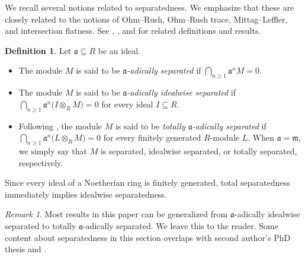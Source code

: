 \documentclass[12pt,reqno]{amsart}
\newtheorem{question}[theorem]{Question}
\theoremstyle{definition}
\newtheorem{definition}[theorem]{Definition}
\theoremstyle{remark}
\newtheorem{remark}[theorem]{Remark}
\theoremstyle{cited}
\theoremstyle{remark}
\theoremstyle{citeddef}
\newcommand{\fm}{\mathfrak{m}}
\begin{document}
	
	
	We recall several notions related to separatedness. We emphasize that these are closely related to the notions of Ohm--Rush, Ohm--Rush trace, Mittag--Leffler, and intersection flatness. See \cite{DET}, \cite{EpsteinShapiro}, and \cite{HJ} for related definitions and results.%
	
	\begin{definition}\label{def:separation-notions}
		Let $\mathfrak a\subseteq R$ be an ideal.
		\begin{itemize}
			\item[(a)] The module $M$ is said to be
			\emph{$\mathfrak a$-adically separated} if
			\(
			\bigcap_{n\geq 1}\mathfrak a^nM=0.
			\)
			
			\item[(b)] The module $M$ is said to be
			\emph{$\mathfrak a$-adically idealwise separated} if
			\(
			\bigcap_{n\geq1}
			\mathfrak a^n\bigl(I\otimes_RM\bigr)=0
			\)
			for every ideal $I\subseteq R$.
			
			\item[(c)] Following \cite{Zoeschinger}, the module $M$ is said to be
			\emph{totally $\mathfrak a$-adically separated} if
			\(
			\bigcap_{n\geq1}
			\mathfrak a^n\bigl(L\otimes_RM\bigr)=0
			\)
			for every finitely generated $R$-module $L$.
			When $\mathfrak a=\fm$, we simply say that $M$ is separated,
			idealwise separated, or totally separated, respectively.
		\end{itemize}
	\end{definition}
	
	Since every ideal of a Noetherian ring is finitely generated, total
	separatedness immediately implies idealwise separatedness.

	
	\begin{remark}\label{rem:local-flatness-idealwise}
		Most results in this paper can be generalized from $\mathfrak a$-adically idealwise separated to totally $\mathfrak a$-adically separated. We leave this to the reader. Some content about separatedness in this section overlaps with second author's PhD thesis \cite{Shravan} and \cite{Pat}.
	\end{remark}
	
\end{document}
